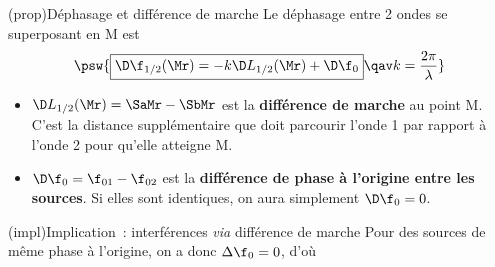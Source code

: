 \documentclass[../../main/main.tex]{subfiles}
\begin{document}
\begin{tcb}(prop){Déphasage et différence de marche}
	Le déphasage entre 2 ondes se superposant en M est
	\[\psw{
			\boxed{\D\f_{1/2}(\Mr) = -k\D L_{1/2}(\Mr) + \D\f_0}
			\qav k=\frac{2\pi}{\lambda}}\]
	\begin{itemize}
		\item $\D L_{1/2}(\Mr) = \SaMr - \SbMr$ est la \textbf{différence de
			      marche} au point M. C'est la distance supplémentaire que doit
		      parcourir l'onde 1 par rapport à l'onde 2 pour qu'elle atteigne M.
		\item $\D\f_0 = \f_{01}-\f_{02}$ est la \textbf{différence de phase à
			      l'origine entre les sources}. Si elles sont identiques, on aura
		      simplement $\D\f_0 = 0$.
	\end{itemize}
\end{tcb}

\begin{tcb}(impl){Implication~: interférences \textit{via} différence de marche}
	Pour des sources de même phase à l'origine, on a donc $\Delta\f_0 = 0$, d'où
	\smallbreak
	\begin{isd}[sidebyside align=top]
		\vspace{-15pt}
		\vspace{-15pt}
		\tcblower
		\vspace{-15pt}
		\vspace{-15pt}
	\end{isd}
\end{tcb}
\end{document}
